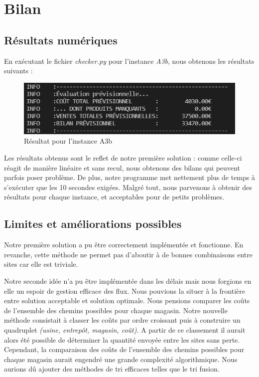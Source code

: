 \documentclass[12pt, a4paper]{article}
\begin{document}

\section{Bilan}
\subsection{Résultats numériques}
En exécutant le fichier \emph{checker.py} pour l'instance \emph{A3b}, nous obtenons les résultats suivants :

\begin{figure}[h] %
    \centering
    \includegraphics[width=1\textwidth]{checker} %
    \caption{Résultat pour l'instance A3b} %
    \label{fig:checker} %
\end{figure}

Les résultats obtenus sont le reflet de notre première solution : comme celle-ci réagit de manière linéaire et sans recul, nous obtenons des bilans qui peuvent parfois poser problème. De plus, notre programme met nettement plus de temps à s'exécuter que les 10 secondes exigées. Malgré tout, nous parvenons à obtenir des résultats pour chaque instance, et acceptables pour de petits problèmes.
\subsection{Limites et améliorations possibles}
Notre première solution a pu être correctement implémentée et fonctionne. En revanche, cette méthode ne permet pas d'aboutir à de bonnes combinaisons entre sites car elle est triviale.

Notre seconde idée n'a pu être implémentée dans les délais mais nous forgions en elle un espoir de gestion efficace des flux. Nous pouvions la situer à la frontière entre solution acceptable et solution optimale. Nous pensions comparer les coûts de l'ensemble des chemins possibles pour chaque magasin. Notre nouvelle méthode consistait à classer les coûts par ordre croissant puis à construire un quadruplet \emph{(usine, entrepôt, magasin, coût)}. A partir de ce classement il aurait alors été possible de déterminer la quantité envoyée entre les sites sans perte. Cependant, la comparaison des coûts de l'ensemble des chemins possibles pour chaque magasin aurait engendré une grande complexité algorithmique. Nous aurions dû ajouter des méthodes de tri efficaces telles que le tri fusion.

\end{document}
